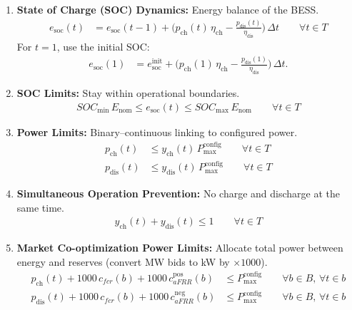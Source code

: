 \begin{enumerate}
  \item \textbf{State of Charge (SOC) Dynamics:} Energy balance of the BESS.
  \begin{align}
    e_{\mathrm{soc}}(t) &= e_{\mathrm{soc}}(t-1) + \Big( p_{\mathrm{ch}}(t)\,\eta_{\mathrm{ch}} - \frac{p_{\mathrm{dis}}(t)}{\eta_{\mathrm{dis}}} \Big)\, \Delta t
    \qquad \forall t\in T
  \end{align}
  For $t=1$, use the initial SOC:
  \begin{align}
    e_{\mathrm{soc}}(1) &= e^{\mathrm{init}}_{\mathrm{soc}} + \Big( p_{\mathrm{ch}}(1)\,\eta_{\mathrm{ch}} - \frac{p_{\mathrm{dis}}(1)}{\eta_{\mathrm{dis}}} \Big)\, \Delta t.
  \end{align}

  \item \textbf{SOC Limits:} Stay within operational boundaries.
  \begin{align}
    SOC_{\min}\,E_{\mathrm{nom}} \le e_{\mathrm{soc}}(t) \le SOC_{\max}\,E_{\mathrm{nom}} \qquad \forall t\in T
  \end{align}

  \item \textbf{Power Limits:} Binary–continuous linking to configured power.
  \begin{align}
    p_{\mathrm{ch}}(t) &\le y_{\mathrm{ch}}(t)\, P^{\mathrm{config}}_{\max} \qquad \forall t\in T \\
    p_{\mathrm{dis}}(t) &\le y_{\mathrm{dis}}(t)\, P^{\mathrm{config}}_{\max} \qquad \forall t\in T
  \end{align}

  \item \textbf{Simultaneous Operation Prevention:} No charge and discharge at the same time.
  \begin{align}
    y_{\mathrm{ch}}(t) + y_{\mathrm{dis}}(t) \le 1 \qquad \forall t\in T
  \end{align}

  \item \textbf{Market Co-optimization Power Limits:} Allocate total power between energy and reserves (convert MW bids to kW by $\times 1000$).
  \begin{align}
    p_{\mathrm{ch}}(t) + 1000\,c_{fcr}(b) + 1000\,c^{\mathrm{pos}}_{aFRR}(b) &\le P^{\mathrm{config}}_{\max} \qquad \forall b\in B,\, \forall t\in b \\
    p_{\mathrm{dis}}(t) + 1000\,c_{fcr}(b) + 1000\,c^{\mathrm{neg}}_{aFRR}(b) &\le P^{\mathrm{config}}_{\max} \qquad \forall b\in B,\, \forall t\in b
  \end{align}


\end{enumerate}
